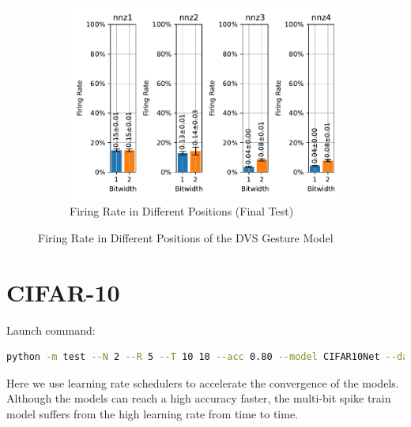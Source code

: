         \begin{figure}[H]
            \centering
            \ContinuedFloat
            \begin{subfigure}[H]{\textwidth}
                \centering
                \includegraphics[width=\textwidth]{../firerate/DVSGesture/plots/dvsgesture_final_firerate.pdf}
                \caption{Firing Rate in Different Positions (Final Test)}
            \end{subfigure}
            \caption{Firing Rate in Different Positions of the DVS Gesture Model}
        \end{figure}

    \section{CIFAR-10}
    \label{appendix:firerate_cifar10}
        Launch command: 
        \begin{lstlisting}[language=Bash, basicstyle=\small, breaklines=true]
python -m test --N 2 --R 5 --T 10 10 --acc 0.80 --model CIFAR10Net --data-path /scratch/zyi/codeSpace/data --dataset CIFAR10 --batch-size 128 --opt adam --lr 1e-5 --lr-scheduler none --epochs 1000 --lr-warmup-epochs 0 --output-dir /scratch/zyi/codeSpace/MultibitSpikes/firerate
        \end{lstlisting}

        Here we use learning rate schedulers to accelerate the convergence of the models. Although the models can reach a high accuracy faster, the multi-bit spike train model suffers from the high learning rate from time to time. 

